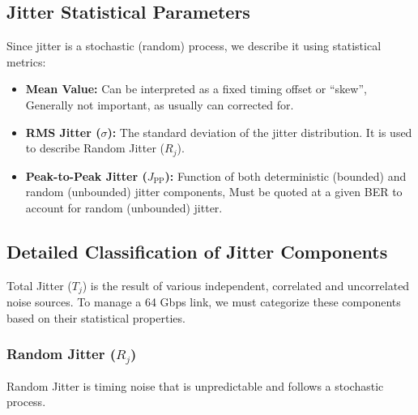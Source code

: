 \documentclass[12pt, a4paper]{report}
\newcommand{\TJ}{T_j}
\newcommand{\RJ}{R_j}
\begin{document}
\subsection{Jitter Statistical Parameters}
\label{subsec:statistical-parameters}

Since jitter is a stochastic (random) process, we describe it using statistical metrics:

\begin{itemize}

\item \textbf{Mean Value:}
    Can be interpreted as a fixed timing offset or “skew”, Generally not important, as usually can corrected for.



    \item \textbf{RMS Jitter (\(\sigma\)):} The standard deviation of the jitter distribution. It is used to describe Random Jitter (\(\RJ\)).
    
    \item \textbf{Peak-to-Peak Jitter (\(J_{\text{PP}}\)):} Function of both deterministic (bounded) and random
    (unbounded) jitter components, Must be quoted at a given BER to account for random
    (unbounded) jitter.
    
\end{itemize}

\subsection{Detailed Classification of Jitter Components}
\label{subsec:jitter-classification}

Total Jitter (\(\TJ\)) is the result of various independent, correlated and uncorrelated noise sources. To manage a 64 Gbps link, we must categorize these components based on their statistical properties.

\subsubsection{Random Jitter (\(\RJ\))}
Random Jitter is timing noise that is unpredictable and follows a stochastic process.
\end{document}

